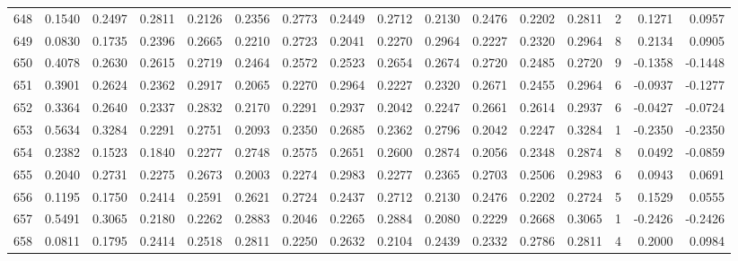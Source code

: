\begin{tabular}{lrrrrrrrrrrrrrrr}
648 &      0.1540 &  0.2497 &  0.2811 &  0.2126 &  0.2356 &  0.2773 &  0.2449 &  0.2712 &  0.2130 &  0.2476 &   0.2202 &     0.2811 &      2 &                    0.1271 &                     0.0957 \\
649 &      0.0830 &  0.1735 &  0.2396 &  0.2665 &  0.2210 &  0.2723 &  0.2041 &  0.2270 &  0.2964 &  0.2227 &   0.2320 &     0.2964 &      8 &                    0.2134 &                     0.0905 \\
650 &      0.4078 &  0.2630 &  0.2615 &  0.2719 &  0.2464 &  0.2572 &  0.2523 &  0.2654 &  0.2674 &  0.2720 &   0.2485 &     0.2720 &      9 &                   -0.1358 &                    -0.1448 \\
651 &      0.3901 &  0.2624 &  0.2362 &  0.2917 &  0.2065 &  0.2270 &  0.2964 &  0.2227 &  0.2320 &  0.2671 &   0.2455 &     0.2964 &      6 &                   -0.0937 &                    -0.1277 \\
652 &      0.3364 &  0.2640 &  0.2337 &  0.2832 &  0.2170 &  0.2291 &  0.2937 &  0.2042 &  0.2247 &  0.2661 &   0.2614 &     0.2937 &      6 &                   -0.0427 &                    -0.0724 \\
653 &      0.5634 &  0.3284 &  0.2291 &  0.2751 &  0.2093 &  0.2350 &  0.2685 &  0.2362 &  0.2796 &  0.2042 &   0.2247 &     0.3284 &      1 &                   -0.2350 &                    -0.2350 \\
654 &      0.2382 &  0.1523 &  0.1840 &  0.2277 &  0.2748 &  0.2575 &  0.2651 &  0.2600 &  0.2874 &  0.2056 &   0.2348 &     0.2874 &      8 &                    0.0492 &                    -0.0859 \\
655 &      0.2040 &  0.2731 &  0.2275 &  0.2673 &  0.2003 &  0.2274 &  0.2983 &  0.2277 &  0.2365 &  0.2703 &   0.2506 &     0.2983 &      6 &                    0.0943 &                     0.0691 \\
656 &      0.1195 &  0.1750 &  0.2414 &  0.2591 &  0.2621 &  0.2724 &  0.2437 &  0.2712 &  0.2130 &  0.2476 &   0.2202 &     0.2724 &      5 &                    0.1529 &                     0.0555 \\
657 &      0.5491 &  0.3065 &  0.2180 &  0.2262 &  0.2883 &  0.2046 &  0.2265 &  0.2884 &  0.2080 &  0.2229 &   0.2668 &     0.3065 &      1 &                   -0.2426 &                    -0.2426 \\
658 &      0.0811 &  0.1795 &  0.2414 &  0.2518 &  0.2811 &  0.2250 &  0.2632 &  0.2104 &  0.2439 &  0.2332 &   0.2786 &     0.2811 &      4 &                    0.2000 &                     0.0984 \\

\end{tabular}
